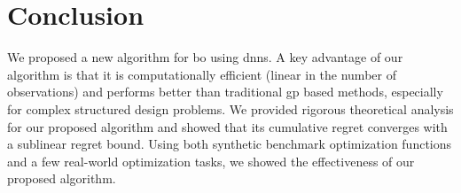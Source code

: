 \section{Conclusion}
We proposed a new algorithm for \acl{bo} using \aclp{dnn}. A key advantage of our algorithm is that it is computationally efficient (linear in the number of observations) and performs better than traditional \acl{gp} based methods, especially for complex structured design problems. We provided rigorous theoretical analysis for our proposed algorithm and showed that its cumulative regret converges with a sublinear regret bound. Using both synthetic benchmark optimization functions and a few real-world optimization tasks, we showed the effectiveness of our proposed algorithm. 